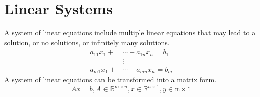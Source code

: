 \section{Linear Systems}

\begin{definition}
    A system of linear equations include multiple linear equations that
    may lead to a solution, or no solutions, or infinitely many solutions.
    \[
        \begin{split}
            a_{11}x_1 + &\cdots + a_{1n}x_n = b_1 \\
                        & \vdots \\
            a_{m1}x_1 + &\cdots + a_{mn}x_n = b_m
        \end{split}
    \]
    A system of linear equations can be transformed into a matrix form.
    \[
        Ax = b, A\in\mathbb{R}^{m\times n}, x\in\mathbb{R}^{n\times 1}, y\in\mathbb{m\times 1}
    \]
\end{definition}


